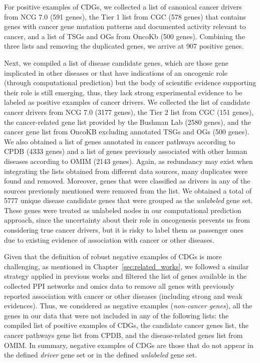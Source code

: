 For positive examples of CDGs, we collected a list of canonical cancer drivers from NCG 7.0 (591 genes), the Tier 1 list from CGC (578 genes) that contains genes with cancer gene mutation patterns and documented activity relevant to cancer, and a list of TSGs and OGs from OncoKb (500 genes). Combining the three lists and removing the duplicated genes, we arrive at 907 positive genes.

Next, we compiled a list of disease candidate genes, which are those gene implicated in other diseases or that have indications of an oncogenic role (\eg through computational prediction) but the body of scientific evidence supporting their role is still emerging, thus, they lack strong experimental evidence to be labeled as positive examples of cancer drivers. We collected the list of candidate cancer drivers from NCG 7.0 (3177 genes), the Tier 2 list from CGC (151 genes), the cancer-related gene list provided by the Bushman Lab (2580 genes), and the cancer gene list from OncoKB excluding annotated TSGs and OGs (500 genes). We also obtained a list of genes annotated in cancer pathways according to CPDB (4333 genes) and a list of genes previously associated with other human diseases according to OMIM (2143 genes). Again, as redundancy may exist when integrating the lists obtained from different data sources, many duplicates were found and removed. Moreover, genes that were classified as drivers in any of the sources previously mentioned were removed from the list. We obtained a total of 5777 unique disease candidate genes that were grouped as the \textit{unlabeled} gene set. These genes were treated as unlabeled nodes in our computational prediction approach, since the uncertainty about their role in oncogenesis prevents us from considering true cancer drivers, but it is risky to label them as passenger ones due to existing evidence of association with cancer or other diseases. 

Given that the definition of robust negative examples of CDGs is more challenging, as mentioned in Chapter~\ref{sec:related_works}, we followed a similar strategy applied in previous works and filtered the list of genes available in the collected PPI networks and omics data to remove all genes with previously reported association with cancer or other diseases (including strong and weak evidences). Thus, we considered as negative examples (\textit{non-cancer genes}), all the genes in our data that were not included in any of the following lists: the compiled list of positive examples of CDGs, the candidate cancer genes list, the cancer pathways gene list from CPDB, and the disease-related genes list from OMIM. In summary, negative examples of CDGs are those that do not appear in the defined  \textit{driver} gene set or in the defined \textit{unlabeled} gene set.

